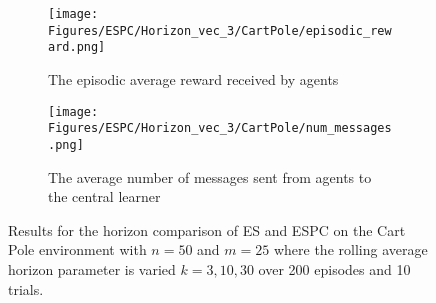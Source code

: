 
\begin{figure}[H]
    \centering
    \begin{subfigure}{0.4\textwidth}
        \centering
        \texttt{[image: Figures/ESPC/Horizon\_vec\_3/CartPole/episodic\_reward.png]}
        \caption{The episodic average reward received by agents}
        \label{fig:HorizonEpisodicReward}
    \end{subfigure}
    \begin{subfigure}{0.4\textwidth}
        \centering
        \texttt{[image: Figures/ESPC/Horizon\_vec\_3/CartPole/num\_messages.png]}
        \caption{The average number of messages sent from agents to the central learner}
        \label{fig:HorizonMessages}
    \end{subfigure}
    \caption{Results for the horizon comparison of ES and ESPC on the Cart Pole environment with $n=50$ and $m=25$ where the rolling average horizon parameter is varied $k=3,10,30$ over 200 episodes and 10 trials.}
    \label{fig:CPHorizon}
\end{figure}

